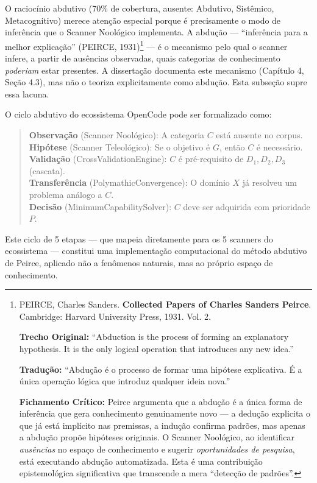 O raciocínio abdutivo (70\% de cobertura, ausente: Abdutivo, Sistêmico, Metacognitivo) merece atenção especial porque é precisamente o modo de inferência que o Scanner Noológico implementa. A abdução --- ``inferência para a melhor explicação'' (PEIRCE, 1931)\footnote{
  PEIRCE, Charles Sanders. \textbf{Collected Papers of Charles Sanders Peirce}. Cambridge: Harvard University Press, 1931. Vol. 2.

  \textbf{Trecho Original:} ``Abduction is the process of forming an explanatory hypothesis. It is the only logical operation that introduces any new idea.''

  \textbf{Tradução:} ``Abdução é o processo de formar uma hipótese explicativa. É a única operação lógica que introduz qualquer ideia nova.''

  \textbf{Fichamento Crítico:} Peirce argumenta que a abdução é a única forma de inferência que gera conhecimento genuinamente novo --- a dedução explicita o que já está implícito nas premissas, a indução confirma padrões, mas apenas a abdução propõe hipóteses originais. O Scanner Noológico, ao identificar \textit{ausências} no espaço de conhecimento e sugerir \textit{oportunidades de pesquisa}, está executando abdução automatizada. Esta é uma contribuição epistemológica significativa que transcende a mera ``detecção de padrões''.
} --- é o mecanismo pelo qual o scanner infere, a partir de ausências observadas, quais categorias de conhecimento \textit{poderiam} estar presentes. A dissertação documenta este mecanismo (Capítulo 4, Seção 4.3), mas não o teoriza explicitamente como abdução. Esta subseção supre essa lacuna.

O ciclo abdutivo do ecossistema OpenCode pode ser formalizado como:

\begin{quote}
\textbf{Observação} (Scanner Noológico): A categoria $C$ está ausente no corpus.\\
\textbf{Hipótese} (Scanner Teleológico): Se o objetivo é $G$, então $C$ é necessário.\\
\textbf{Validação} (CrossValidationEngine): $C$ é pré-requisito de $D_1, D_2, D_3$ (cascata).\\
\textbf{Transferência} (PolymathicConvergence): O domínio $X$ já resolveu um problema análogo a $C$.\\
\textbf{Decisão} (MinimumCapabilitySolver): $C$ deve ser adquirida com prioridade $P$.
\end{quote}

Este ciclo de 5 etapas --- que mapeia diretamente para os 5 scanners do ecossistema --- constitui uma implementação computacional do método abdutivo de Peirce, aplicado não a fenômenos naturais, mas ao próprio espaço de conhecimento.

